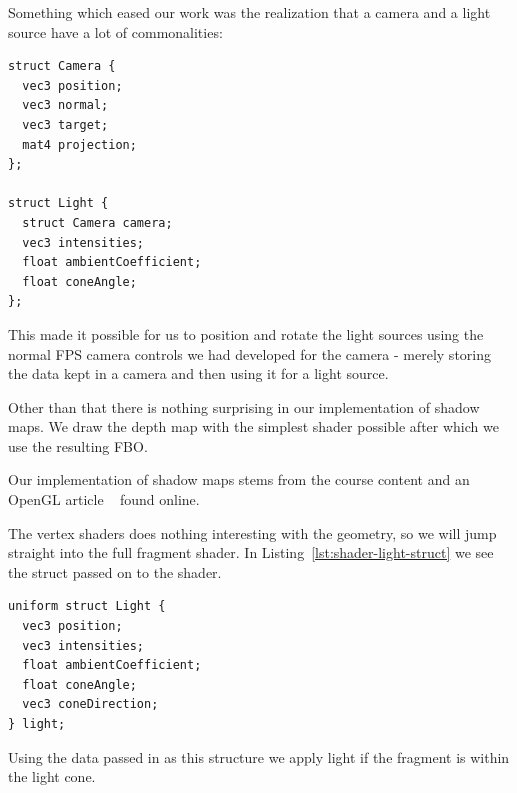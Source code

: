 \documentclass[a4paper,12pt]{article}
\begin{document}
Something which eased our work was the realization that a camera and a light source have a lot of commonalities:

\begin{lstlisting}[label=lst:lamp-struct,caption=Light source struct]
struct Camera {
  vec3 position;
  vec3 normal;
  vec3 target;
  mat4 projection;
};

struct Light {
  struct Camera camera;
  vec3 intensities;
  float ambientCoefficient;
  float coneAngle;
};
\end{lstlisting}

This made it possible for us to position and rotate the light sources using the normal FPS camera controls we had developed for the camera - merely storing the data kept in a camera and then using it for a light source.

Other than that there is nothing surprising in our implementation of shadow maps. We draw the depth map with the simplest shader possible after which we use the resulting FBO.

Our implementation of shadow maps stems from the course content and an OpenGL article ~\cite{shadow-maps-tutorial} found online.

The vertex shaders does nothing interesting with the geometry, so we will jump straight into the full fragment shader. In Listing~\ref{lst:shader-light-struct} we see the struct passed on to the shader.

\begin{lstlisting}[label=lst:shader-light-struct,caption= The light struct received in the shader.]
uniform struct Light {
  vec3 position;
  vec3 intensities;
  float ambientCoefficient;
  float coneAngle;
  vec3 coneDirection;
} light;
\end{lstlisting}

Using the data passed in as this structure we apply light if the fragment is within the light cone.
\end{document}
